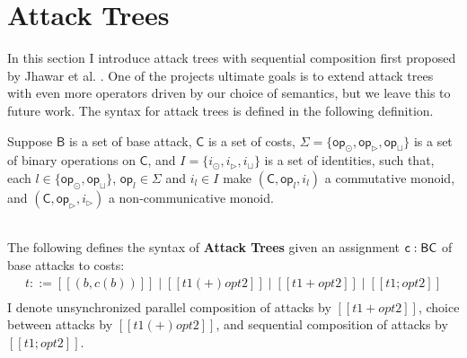 \documentclass{llncs}
\let\to\relax
\newcommand{\to}{\rightarrow}
\begin{document}
\section{Attack Trees}
\label{sec:attack_trees}
In this section I introduce attack trees with sequential composition
first proposed by Jhawar et al. \cite{Jhawar:2015}.  One of the
projects ultimate goals is to extend attack trees with even more
operators driven by our choice of semantics, but we leave this to
future work.  The syntax for attack trees is defined in the following
definition.
\begin{definition}
  \label{def:atrees}
  Suppose $\mathsf{B}$ is a set of base attack, $\mathsf{C}$ is
  a set of costs, $\Sigma =
  \{\mathsf{op}_{\odot}, \mathsf{op}_\rhd, \mathsf{op}_\sqcup \}$ is a set of binary
  operations on $\mathsf{C}$, and $I = \{i_\odot, i_\rhd, i_\sqcup\}$ is a set of
  identities, such that, each $l \in \{ \mathsf{op}_{\odot}, \mathsf{op}_\sqcup \}$, $\mathsf{op}_l \in \Sigma$ and $i_l \in
  I$ make $(\mathsf{C}, \mathsf{op}_l, i_l)$ a commutative monoid, and
  $(\mathsf{C}, \mathsf{op}_\rhd, i_\rhd)$ a non-communicative monoid.

  \ \\
  \noindent
  The following defines the syntax of \textbf{Attack Trees} given an
  assignment $\mathsf{c} : \mathsf{B} \to \mathsf{C}$ of base attacks
  to costs:
  \[
  \begin{array}{lll}
    t ::= [[(b, c(b))]] \mid [[t1 (+)op t2]] \mid [[t1 +op t2]] \mid [[t1 ;op  t2]]\\
  \end{array}
  \]
  I denote unsynchronized parallel composition of attacks by $[[t1 +op
      t2]]$, choice between attacks by $[[t1 (+)op t2]]$, and sequential
  composition of attacks by $[[t1 ;op t2]]$.


\end{definition}
\end{document}
